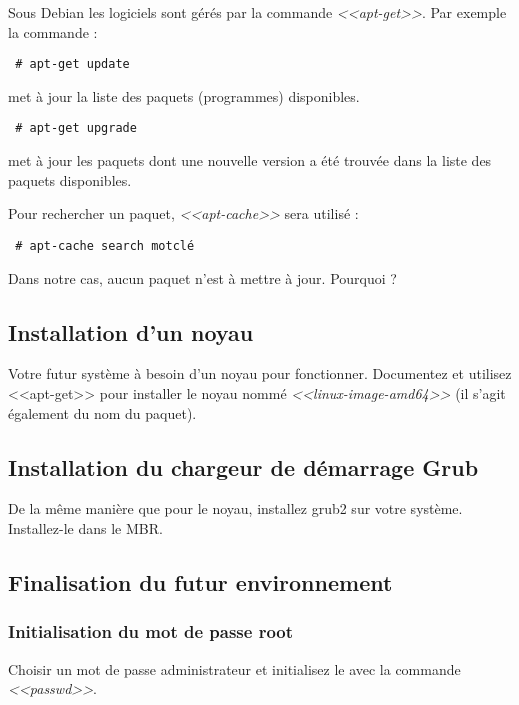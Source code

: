 \documentclass[11pt]{article}
\begin{document}
Sous Debian les logiciels sont gérés par la commande \emph{<<apt-get>>}. Par
exemple la commande :

\begin{verbatim}
 # apt-get update
\end{verbatim}

met à jour la liste des paquets (programmes) disponibles.

\begin{verbatim}
 # apt-get upgrade
\end{verbatim}

met à jour les paquets dont une nouvelle version a été trouvée dans la liste
des paquets disponibles.

Pour rechercher un paquet, \emph{<<apt-cache>>} sera utilisé :

\begin{verbatim}
 # apt-cache search motclé
\end{verbatim}

Dans notre cas, aucun paquet n'est à mettre à jour. Pourquoi ?

\subsection{Installation d'un noyau}

Votre futur système à besoin d'un noyau pour fonctionner. Documentez et
utilisez <<apt-get>> pour installer le noyau nommé \emph{<<linux-image-amd64>>}
(il s'agit également du nom du paquet).

\subsection{Installation du chargeur de démarrage Grub}

De la même manière que pour le noyau, installez grub2 sur votre système.
Installez-le dans le MBR.

\subsection{Finalisation du futur environnement}

\subsubsection{Initialisation du mot de passe root}

Choisir un mot de passe administrateur et initialisez le avec la commande
\emph{<<passwd>>}.
\end{document}

